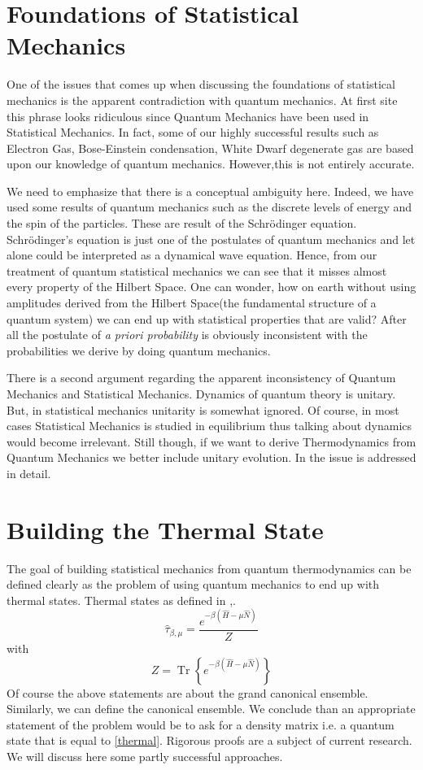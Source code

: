 \documentclass[a4paper,12pt]{article}
\begin{document}
\section{Foundations of Statistical Mechanics}\par
One of the issues that comes up when discussing the foundations of statistical mechanics is the apparent contradiction with quantum mechanics. At first site this phrase looks ridiculous since Quantum Mechanics have been used in Statistical Mechanics. In fact, some of our highly successful results such as Electron Gas, Bose-Einstein condensation, White Dwarf degenerate gas are based upon our knowledge of quantum mechanics. However,this is not entirely accurate.
\par  We need to emphasize that there is a conceptual ambiguity here. Indeed, we have used some results of quantum mechanics such as the discrete levels of energy and the spin of the particles. These are result of the Schr\"odinger
equation. Schr\"odinger's equation is just one of the postulates of quantum mechanics and let alone could be interpreted as a dynamical wave equation. Hence, from our treatment of quantum 
statistical mechanics we can see that it misses almost every property of the Hilbert Space. One can wonder, how on earth without using amplitudes derived from the Hilbert Space(the fundamental structure of a quantum system) we can end up with statistical properties that are valid? After all the postulate of \textit{a priori probability} is obviously inconsistent with the probabilities we derive by doing quantum mechanics.\par
There is a second argument regarding the apparent inconsistency of Quantum Mechanics and Statistical Mechanics. Dynamics of quantum theory is unitary. But, in statistical mechanics unitarity is somewhat ignored. Of course, in most cases Statistical Mechanics is studied in equilibrium thus talking about dynamics would become irrelevant. Still though, if we want to derive Thermodynamics from Quantum Mechanics we better include unitary evolution. In \cite{goold2016role} the issue is addressed in detail.
\section{Building the Thermal State}
The goal of building statistical mechanics from quantum thermodynamics can be defined clearly as the problem of using quantum mechanics to end up with thermal states. Thermal states as defined in \cite{PATHRIA2011115},\cite{potts2019introduction}.
\begin{equation}\hat{\tau}_{\beta, \mu}=\frac{e^{-\beta(\hat{H}-\mu \hat{N})}}{Z}
\label{thermal}
\end{equation}
with
\begin{equation}
Z=\operatorname{Tr}\left\{e^{-\beta(\hat{H}-\mu \hat{N})}\right\}
\end{equation}
Of course the above statements are about the grand canonical ensemble. Similarly, we can define the canonical ensemble. We conclude than an appropriate statement of the problem would be to ask for a density matrix i.e. a quantum state that is equal to \eqref{thermal}. Rigorous proofs are a subject of current research. We will discuss here some partly successful approaches.
\end{document}

